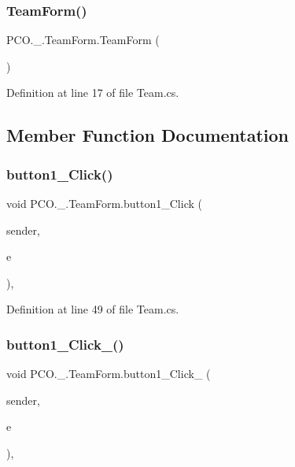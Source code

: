 \subsubsection{\texorpdfstring{Team\+Form()}{TeamForm()}}
{\footnotesize\ttfamily P\+C\+O.\+\_.\+Team\+Form.\+Team\+Form (\begin{DoxyParamCaption}{ }\end{DoxyParamCaption})\hspace{0.3cm}{\ttfamily [inline]}}



Definition at line 17 of file Team.\+cs.



\subsection{Member Function Documentation}
\mbox{\label{classPCO_1_1__0_1_1TeamForm_add11c999c9095c4ef00332838caba21f}} 
\subsubsection{\texorpdfstring{button1\+\_\+\+Click()}{button1\_Click()}}
{\footnotesize\ttfamily void P\+C\+O.\+\_.\+Team\+Form.\+button1\+\_\+\+Click (\begin{DoxyParamCaption}\item[{object}]{sender,  }\item[{Event\+Args}]{e }\end{DoxyParamCaption})\hspace{0.3cm}{\ttfamily [inline]}, {\ttfamily [private]}}



Definition at line 49 of file Team.\+cs.

\mbox{\label{classPCO_1_1__0_1_1TeamForm_aeec31c575e52aa85997d15790bf8247b}} 
\subsubsection{\texorpdfstring{button1\+\_\+\+Click\+\_()}{button1\_Click\_1()}}
{\footnotesize\ttfamily void P\+C\+O.\+\_.\+Team\+Form.\+button1\+\_\+\+Click\+\_ (\begin{DoxyParamCaption}\item[{object}]{sender,  }\item[{Event\+Args}]{e }\end{DoxyParamCaption})\hspace{0.3cm}{\ttfamily [inline]}, {\ttfamily [private]}}



